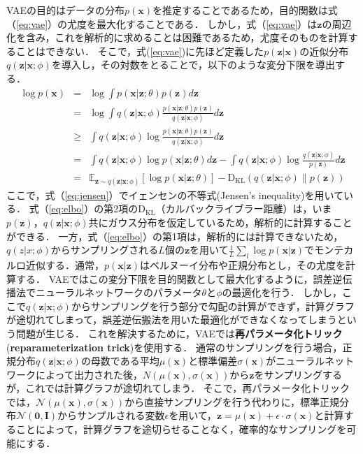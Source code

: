 VAEの目的はデータの分布$p(\bm{x})$を推定することであるため，目的関数は式（\ref{eq:vae}）の尤度を最大化することである．
しかし，式（\ref{eq:vae}）は$\bm{z}$の周辺化を含み，これを解析的に求めることは困難であるため，尤度そのものを計算することはできない．
そこで，式(\ref{eq:vae})に先ほど定義した$p(\bm{z}|\bm{x})$の近似分布$q(\bm{z}|\bm{x};\phi)$を導入し，その対数をとることで，以下のような変分下限を導出する．
\begin{eqnarray}
\log p(\bm{x}) &=& \log \int p(\bm{x}|\bm{z}; \theta) p(\bm{z}) d\bm{z} \nonumber \\
&=& \log \int q(\bm{z}|\bm{x}; \phi) \frac{p(\bm{x}|\bm{z}; \theta) p(\bm{z})}{q(\bm{z}|\bm{x}; \phi)} d\bm{z} \nonumber \\
&\geq& \int q(\bm{z}|\bm{x}; \phi) \log \frac{p(\bm{x}|\bm{z}; \theta) p(\bm{z})}{q(\bm{z}|\bm{x}; \phi)} d\bm{z} \label{eq:jensen}\\
&=& \int q(\bm{z}|\bm{x}; \phi) \log p(\bm{x}|\bm{z}; \theta) d\bm{z} - \int q(\bm{z}|\bm{x}; \phi) \log \frac{q(\bm{z}|\bm{x}; \phi)}{p(\bm{z})} d\bm{z} \nonumber \\
&=& \mathbb{E}_{\bm{z} \sim q(\bm{z}|\bm{x}; \phi)} [\log p(\bm{x}|\bm{z}; \theta)] - \mathrm{D_{KL}}(q(\bm{z}|\bm{x}; \phi) \| p(\bm{z})) \label{eq:elbo}
\end{eqnarray}
ここで，式（\ref{eq:jensen}）でイェンセンの不等式(Jensen's inequality)を用いている．
式（\ref{eq:elbo}）の第2項の$\mathrm{D_{KL}}$（カルバックライブラー距離）は，いま$p(\bm{z})$，$q(\bm{z}|\bm{x}; \phi)$共にガウス分布を仮定しているため，解析的に計算することができる．
一方，式（\ref{eq:elbo}）の第1項は，解析的には計算できないため，$q(z|x; \phi)$からサンプリングされる$L$個の$\bm{z}$を用いて$\frac{1}{L} \sum_{l} \log p(\bm{x}|\bm{z})$でモンテカルロ近似する．通常，$p(\bm{x}|\bm{z})$はベルヌーイ分布や正規分布とし，その尤度を計算する．
VAEではこの変分下限を目的関数として最大化するように，誤差逆伝播法でニューラルネットワークのパラメータ$\theta$と$\phi$の最適化を行う．
しかし，ここで$q(\bm{z}|\bm{x}; \phi)$からサンプリングを行う部分で勾配の計算ができず，計算グラフが途切れてしまって，誤差逆伝搬法を用いた最適化ができなくなってしまうという問題が生じる．
これを解決するために，VAEでは{\bf 再パラメータ化トリック}({\bf reparameterization trick})を使用する．
通常のサンプリングを行う場合，正規分布$q(\bm{z}|\bm{x}; \phi)$の母数である平均$\mu (\bm{x})$と標準偏差$\sigma (\bm{x})$がニューラルネットワークによって出力された後，$N(\mu (\bm{x}), \sigma (\bm{x}))$から$\bm{z}$をサンプリングするが，これでは計算グラフが途切れてしまう．
そこで，再パラメータ化トリックでは，$\mathcal{N}(\mu (\bm{x}), \sigma (\bm{x}))$から直接サンプリングを行う代わりに，標準正規分布$\mathcal{N}(\bm{0},\bm{I})$からサンプルされる変数$\epsilon$を用いて，$\bm{z}=\mu (\bm{x})+ \epsilon \cdot \sigma (\bm{x})$と計算することによって，計算グラフを途切らせることなく，確率的なサンプリングを可能にする．

